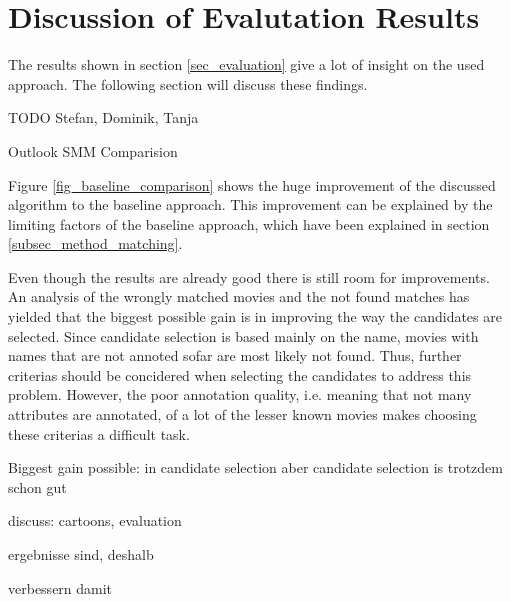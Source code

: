\section{Discussion of Evalutation Results}
\label{sec_discussion}

The results shown in section \ref{sec_evaluation} give a lot of insight on the used approach.
The following section will discuss these findings.

TODO Stefan, Dominik, Tanja

Outlook SMM Comparision

Figure \ref{fig_baseline_comparison} shows the huge improvement of the discussed algorithm to the baseline approach.
This improvement can be explained by the limiting factors of the baseline approach, which have been explained in section \ref{subsec_method_matching}.


Even though the results are already good there is still room for improvements.
An analysis of the wrongly matched movies and the not found matches has yielded that the biggest possible gain is in improving the way the candidates are selected.
Since candidate selection is based mainly on the name, movies with names that are not annoted sofar are most likely not found.
Thus, further criterias should be concidered when selecting the candidates to address this problem.
However, the poor annotation quality, i.e. meaning that not many attributes are annotated, of a lot of the lesser known movies makes choosing these criterias a difficult task.


Biggest gain possible: in candidate selection
aber candidate selection is trotzdem schon gut

discuss: cartoons, evaluation

ergebnisse sind, deshalb

verbessern damit

